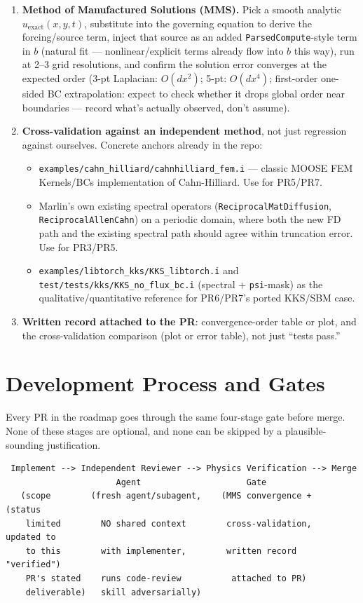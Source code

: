 \documentclass[11pt]{article}
\newenvironment{schematic}{%
  \begin{tcolorbox}[breakable, colback=codebg, colframe=gray!40, boxrule=0.4pt, arc=1mm, left=4mm, right=4mm, top=2mm, bottom=2mm]
  \ttfamily\footnotesize
}{%
  \end{tcolorbox}
}
\begin{document}
\begin{enumerate}[leftmargin=*]
\item \textbf{Method of Manufactured Solutions (MMS).} Pick a smooth
analytic $u_{\text{exact}}(x,y,t)$, substitute into the governing equation
to derive the forcing/source term, inject that source as an added
\texttt{ParsedCompute}-style term in $b$ (natural fit --- nonlinear/explicit
terms already flow into $b$ this way), run at 2--3 grid resolutions, and
confirm the solution error converges at the expected order (3-pt Laplacian:
$O(dx^2)$; 5-pt: $O(dx^4)$; first-order one-sided BC extrapolation: expect
to check whether it drops global order near boundaries --- record what's
actually observed, don't assume).
\item \textbf{Cross-validation against an independent method}, not just
regression against ourselves. Concrete anchors already in the repo:
\begin{itemize}
\item \texttt{examples/cahn\_hilliard/cahnhilliard\_fem.i} --- classic MOOSE
FEM Kernels/BCs implementation of Cahn-Hilliard. Use for PR5/PR7.
\item Marlin's own existing spectral operators
(\texttt{ReciprocalMatDiffusion}, \texttt{ReciprocalAllenCahn}) on a
periodic domain, where both the new FD path and the existing spectral path
should agree within truncation error. Use for PR3/PR5.
\item \texttt{examples/libtorch\_kks/KKS\_libtorch.i} and
\texttt{test/tests/kks/KKS\_no\_flux\_bc.i} (spectral + \texttt{psi}-mask) as
the qualitative/quantitative reference for PR6/PR7's ported KKS/SBM case.
\end{itemize}
\item \textbf{Written record attached to the PR}: convergence-order table or
plot, and the cross-validation comparison (plot or error table), not just
``tests pass.''
\end{enumerate}

\section{Development Process and Gates}
\label{sec:gates}

Every PR in the roadmap goes through the same four-stage gate before merge.
None of these stages are optional, and none can be skipped by a
plausible-sounding justification.

\begin{schematic}
\begin{verbatim}
 Implement --> Independent Reviewer --> Physics Verification --> Merge
                      Agent                     Gate
   (scope        (fresh agent/subagent,    (MMS convergence +     (status
    limited        NO shared context        cross-validation,     updated to
    to this        with implementer,        written record         "verified")
    PR's stated    runs code-review          attached to PR)
    deliverable)   skill adversarially)
\end{verbatim}
\end{schematic}
\end{document}
